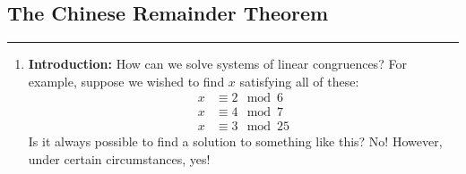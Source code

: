 \documentclass[class=article, crop=false]{standalone}
\begin{document}
\subsection{The Chinese Remainder Theorem}
\rule{\textwidth}{1pt}
\begin{enumerate}[1.]
	\item \textbf{Introduction:}
	How can we solve systems of linear congruences? For example,
	suppose we wished to find $x$ satisfying all of these:
	\begin{align*}
		x &\equiv 2\mod 6 \\
		x &\equiv 4\mod 7 \\
		x &\equiv 3\mod 25
	\end{align*}
	Is it always possible to find a solution to something like this? No!
	However, under certain circumstances, yes!
	

\end{enumerate}
\end{document}
